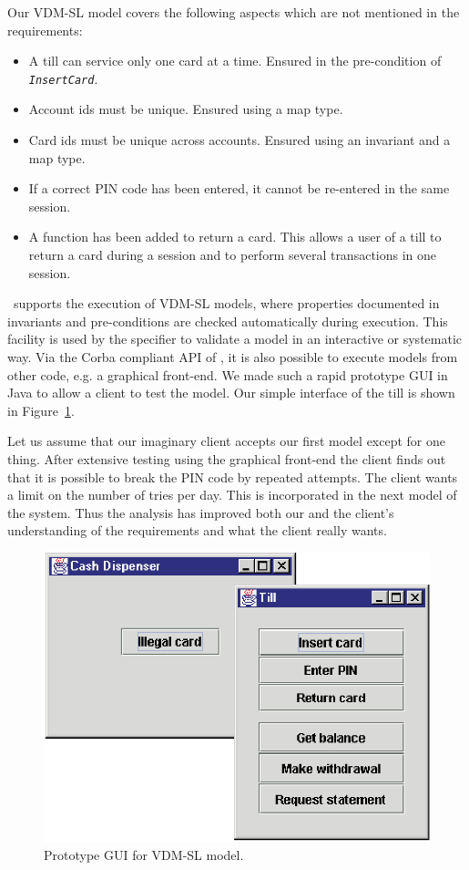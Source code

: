 \documentclass[\pformat,12pt,twoside]{article}
\begin{document}
Our VDM-SL model covers the following aspects which are not mentioned 
in the requirements:
\begin{itemize}
\item
A till can service only one card at a time. Ensured in the pre-condition 
of \texttt{\emph{InsertCard}}.
\item
Account ids must be unique. Ensured using a map type.
\item
Card ids must be unique across accounts. Ensured using an invariant 
and a map type.
\item
If a correct PIN code has been entered, it cannot be re-entered 
in the same session.
\item
A function has been added to return a card. This allows a user 
of a till to return a card during a session and to perform several 
transactions in one session.
\end{itemize}


\vdmtools\  supports the execution of VDM-SL 
models, where properties documented in invariants and pre-conditions 
are checked automatically during execution. This facility is 
used by the specifier to validate a model in an interactive or 
systematic way. Via the Corba compliant API of \vdmtools, 
it is also possible to execute models from other code, e.g. a 
graphical front-end. We made such a rapid prototype GUI in Java 
to allow a client to test the model. Our simple interface of 
the till is shown in Figure~\ref{fig:VDMSLscreen}.

Let us assume that our imaginary client accepts our first model 
except for one thing. After extensive testing using the graphical 
front-end the client finds out that it is possible to break the 
PIN code by repeated attempts. The client wants a limit on the 
number of tries per day. This is incorporated in the next model 
of the system. Thus the analysis has improved both our and the 
client's understanding of the requirements and what the client 
really wants.

\begin{figure}[htbp]
\begin{center}
\includegraphics[width=.7\textwidth]{slscreen}
\caption{Prototype GUI for VDM-SL model.\label{fig:VDMSLscreen}}
\end{center}
\end{figure}
\end{document}
